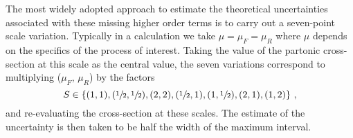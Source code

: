 \documentclass[main.tex]{subfiles}
\begin{document}
    The most widely adopted approach to estimate the
    theoretical uncertainties associated with these
    missing higher order terms is to carry out a seven-point
    scale variation. Typically in a calculation we take
    $\mu = \mu_{F} = \mu_{R}$ where $\mu$ depends on the specifics
    of the process of interest. Taking the value of the
    partonic cross-section at this scale as the central value,
    the seven variations correspond to multiplying ($\mu_{F}, \, \mu_{R}$) by the factors 
    \begin{equation}\label{eqn:scale_variations}
        S \in \left\{(1, 1), (\sfrac{1}{2}, \sfrac{1}{2}), (2, 2), (\sfrac{1}{2}, 1), (1, \sfrac{1}{2}), (2, 1), (1, 2) \right\} \, ,
    \end{equation}
    and re-evaluating the
    cross-section at these scales.
    The estimate of the uncertainty is then taken
    to be half the width of the maximum interval.
\end{document}
